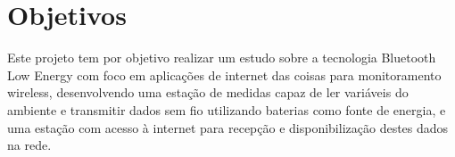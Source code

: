 \section{Objetivos}



%
Este projeto tem por objetivo realizar um estudo sobre a tecnologia Bluetooth
Low Energy com foco em aplicações de internet das coisas para monitoramento
wireless, desenvolvendo uma estação de medidas capaz de ler variáveis do
ambiente e transmitir dados sem fio utilizando baterias como fonte de energia,
e uma estação com acesso à internet para recepção e disponibilização destes
dados na rede.

